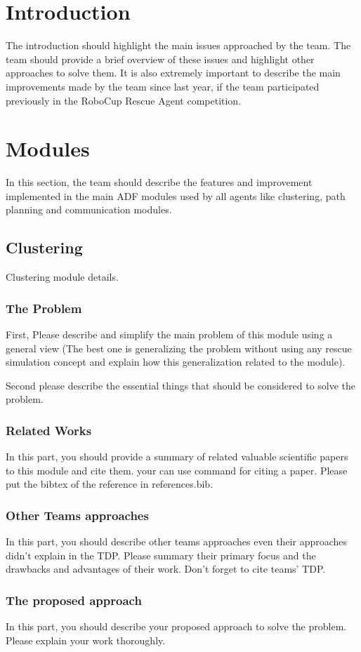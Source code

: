 \documentclass[runningheads,a4paper]{llncs}
\begin{document}
\section{Introduction}
The introduction should highlight the main issues approached by the team. The
team should provide a brief overview of these issues and highlight other
approaches to solve them. It is also extremely important to describe the main
improvements made by the team since last year, if the team participated
previously in the RoboCup Rescue Agent competition.
\section{Modules}
In this section, the team should describe the features and improvement
implemented in the main ADF modules used by all agents like clustering, path
planning and communication modules.
\subsection{Clustering}
Clustering module details.
\subsubsection{The Problem}
First, Please describe and simplify the main problem of this module using a general view (The best one is generalizing the problem without using any rescue simulation concept and explain how this generalization related to the module).

Second please describe the essential things that should be considered to solve the problem.
\subsubsection{Related Works}
In this part, you should provide a summary of related valuable scientific papers to this module and cite them. your can use command \cite{ref1} for citing a paper. Please put the bibtex of the reference in references.bib.
\subsubsection{Other Teams approaches}
In this part, you should describe other teams approaches even their approaches didn't explain in the TDP. Please summary their primary focus and the drawbacks and advantages of their work. Don't forget to cite teams' TDP.
\subsubsection{The proposed approach}
In this part, you should describe your proposed approach to solve the problem. Please explain your work thoroughly.
\end{document}
